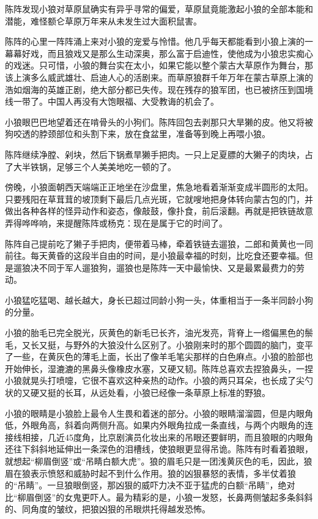 \par 陈阵发现小狼对草原鼠确实有异乎寻常的偏爱，草原鼠竟能激起小狼的全部本能和潜能，难怪额仑草原万年来从未发生过大面积鼠害。
\par 陈阵的心里一阵阵涌上来对小狼的宠爱与怜惜。他几乎每天都能看到小狼上演的一幕幕好戏，而且狼戏又是那么生动深奥，那么富于启迪性，使他成为小狼忠实痴心的戏迷。只可惜，小狼的舞台实在太小，如果它能以整个蒙古大草原作为舞台，那该上演多么威武雄壮、启迪人心的活剧来。而草原狼群千年万年在蒙古草原上演的浩如烟海的英雄正剧，绝大部分都已失传。现在残存的狼军团，也已被挤压到国境线一带了。中国人再没有大饱眼福、大受教诲的机会了。
\par 小狼眼巴巴地望着还在啃骨头的小狗们。陈阵回包去剥那只大旱獭的皮。他又将被狗咬透的脖颈部位和头割下来，放在食盆里，准备等到晚上再喂小狼。
\par 陈阵继续净膛、剁块，然后下锅煮旱獭手把肉。一只上足夏膘的大獭子的肉块，占了大半铁锅，足够三个人美美地吃一顿的了。
\par 
\par 傍晚，小狼面朝西天端端正正地坐在沙盘里，焦急地看着渐渐变成半圆形的太阳。只要残阳在草茸茸的坡顶剩下最后几点光斑，它就嗖地把身体转向蒙古包的门，并做出各种各样的怪异动作和姿态，像敲鼓，像扑食，前后滚翻。再就是把铁链故意弄得哗哗响，来提醒陈阵或杨克：现在是属于它的时间了。
\par 陈阵自己提前吃了獭子手把肉，便带着马棒，牵着铁链去遛狼，二郎和黄黄也一同前往。每天黄昏的这段半自由的时间，是小狼最幸福的时刻，比吃食还要幸福。但是遛狼决不同于军人遛狼狗，遛狼也是陈阵一天中最愉快、又是最累最费力的劳动。
\par 小狼猛吃猛喝、越长越大，身长已超过同龄小狗一头，体重相当于一条半同龄小狗的分量。
\par 小狼的胎毛已完全脱光，灰黄色的新毛已长齐，油光发亮，背脊上一绺偏黑色的鬃毛，又长又挺，与野外的大狼没什么区别了。小狼刚来时的那个圆圆的脑门，变平了一些，在黄灰色的薄毛上面，长出了像羊毛笔尖那样的白色麻点。小狼的脸部也开始伸长，湿漉漉的黑鼻头像橡皮水塞，又硬又韧。陈阵总喜欢去捏狼鼻头，一捏小狼就晃头打喷嚏，它很不喜欢这种亲热的动作。小狼的两只耳朵，也长成了尖勺状的又硬又挺的长耳，从远处看，小狼已经像一条草原上标准的野狼。
\par 小狼的眼睛是小狼脸上最令人生畏和着迷的部分。小狼的眼睛溜溜圆，但是内眼角低，外眼角高，斜着向两侧升高。如果内外眼角拉成一条直线，与两个内眼角的连接线相接，几近45度角，比京剧演员化妆出来的吊眼还要鲜明，而且狼眼的内眼角还往下斜斜地延伸出一条深色的泪槽线，使狼眼更显得吊诡。陈阵有时看着狼眼，就想起“柳眉倒竖”或“吊睛白额大虎”。狼的眉毛只是一团浅黄灰色的毛，因此，狼眉在狼表示愤怒和威胁时起不到什么作用。狼的凶狠暴怒的表情，多半仗着狼的“吊睛”。一旦狼眼倒竖，那凶狠的威吓力决不亚于猛虎的白额“吊睛”，绝对比“柳眉倒竖”的女鬼更吓人。最为精彩的是，小狼一发怒，长鼻两侧皱起多条斜斜的、同角度的皱纹，把狼凶狠的吊眼烘托得越发恐怖。
